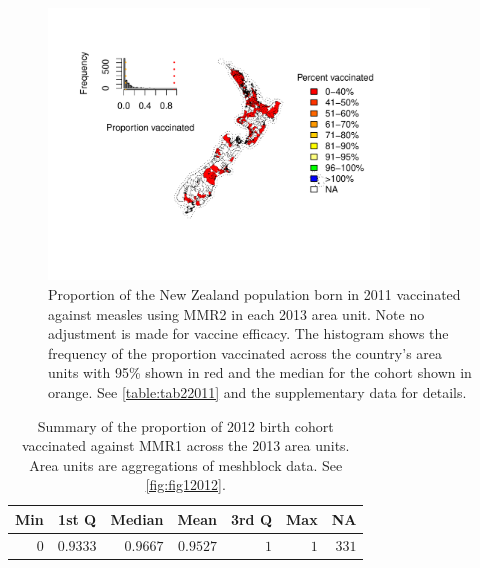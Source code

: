 \documentclass{article}
\begin{document}
\begin{figure}
\begin{center}
    \includegraphics[width=0.9\textwidth]{nir_census_MMR2_NIR_2011.pdf}
 \end{center}
    \caption{Proportion of the New Zealand population born in 2011 vaccinated against measles using MMR2 in each 2013 area unit. Note no adjustment is made for vaccine efficacy. The histogram shows the frequency of the proportion vaccinated across the country's area units with 95\% shown in red and the median for the cohort shown in orange. See \autoref{table:tab22011} and the supplementary data for details.}
\label{fig:fig22011}
\end{figure}

 \vspace{5mm} %
\begin{table}
\begin{center}
\begin{tabular}{rrrrrrr}
\hline\hline
\multicolumn{1}{c}{Min}&\multicolumn{1}{c}{1st Q}&\multicolumn{1}{c}{Median}&\multicolumn{1}{c}{Mean}&\multicolumn{1}{c}{3rd Q}&\multicolumn{1}{c}{Max}&\multicolumn{1}{c}{NA}\tabularnewline
\hline
$0$&$0.9333$&$0.9667$&$0.9527$&$1$&$1$&$331$\tabularnewline
\hline
\end{tabular}\end{center}\caption{Summary of the proportion of 2012 birth cohort vaccinated against MMR1 across the 2013 area units. Area units are aggregations of meshblock data. See \autoref{fig:fig12012}.}
\label{table:tab12012}
\end{table}
\end{document}
